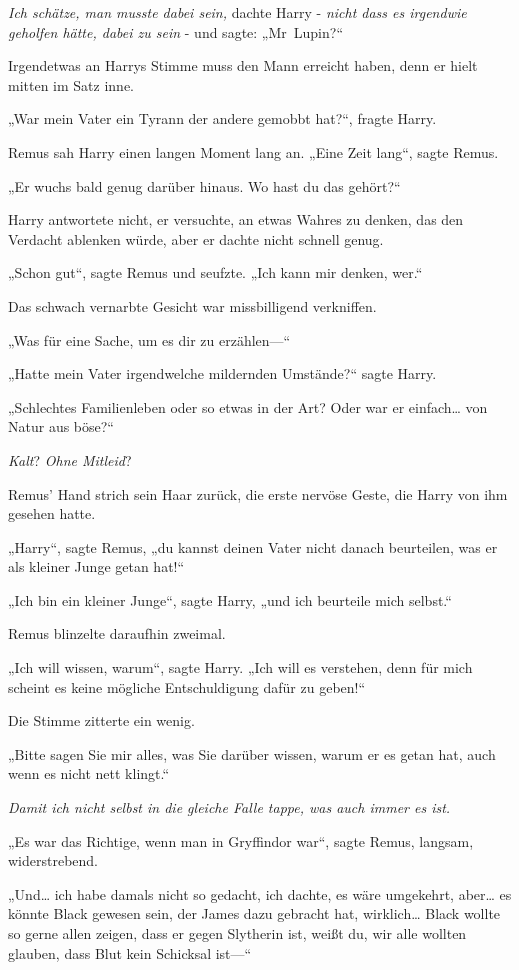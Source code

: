 {\emph{Ich schätze, man musste dabei sein,} dachte Harry - \emph{nicht dass es irgendwie geholfen hätte, dabei zu sein} - und sagte: „Mr~Lupin?“

Irgendetwas an Harrys Stimme muss den Mann erreicht haben, denn er hielt mitten im Satz inne.

„War mein Vater ein Tyrann der andere gemobbt hat?“, fragte Harry.

Remus sah Harry einen langen Moment lang an. „Eine Zeit lang“, sagte Remus.

„Er wuchs bald genug darüber hinaus. Wo hast du das gehört?“

Harry antwortete nicht, er versuchte, an etwas Wahres zu denken, das den Verdacht ablenken würde, aber er dachte nicht schnell genug.

„Schon gut“, sagte Remus und seufzte. „Ich kann mir denken, wer.“

Das schwach vernarbte Gesicht war missbilligend verkniffen.

„Was für eine Sache, um es dir zu erzählen—“

„Hatte mein Vater irgendwelche mildernden Umstände?“ sagte Harry.

„Schlechtes Familienleben oder so etwas in der Art? Oder war er einfach… von Natur aus böse?“

\emph{Kalt}? \emph{Ohne Mitleid}?

Remus' Hand strich sein Haar zurück, die erste nervöse Geste, die Harry von ihm gesehen hatte.

„Harry“, sagte Remus, „du kannst deinen Vater nicht danach beurteilen, was er als kleiner Junge getan hat!“

„Ich bin ein kleiner Junge“, sagte Harry, „und ich beurteile mich selbst.“

Remus blinzelte daraufhin zweimal.

„Ich will wissen, warum“, sagte Harry. „Ich will es verstehen, denn für mich scheint es keine mögliche Entschuldigung dafür zu geben!“

Die Stimme zitterte ein wenig.

„Bitte sagen Sie mir alles, was Sie darüber wissen, warum er es getan hat, auch wenn es nicht nett klingt.“

\emph{Damit ich nicht selbst in die gleiche Falle tappe, was auch immer es ist.}

„Es war das Richtige, wenn man in Gryffindor war“, sagte Remus, langsam, widerstrebend.

„Und… ich habe damals nicht so gedacht, ich dachte, es wäre umgekehrt, aber… es könnte Black gewesen sein, der James dazu gebracht hat, wirklich… Black wollte so gerne allen zeigen, dass er gegen Slytherin ist, weißt du, wir alle wollten glauben, dass Blut kein Schicksal ist—“

}
